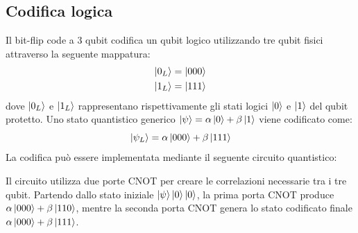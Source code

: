 \documentclass[a4paper,12pt]{report}
\theoremstyle{plain}
\begin{document}
\subsection{Codifica logica}
Il bit-flip code a 3 qubit codifica un qubit logico utilizzando tre qubit fisici attraverso la seguente mappatura:
\begin{align}
\ket{0_L} &= \ket{000} \\
\ket{1_L} &= \ket{111}
\end{align}
dove $\ket{0_L}$ e $\ket{1_L}$ rappresentano rispettivamente gli stati logici $\ket{0}$ e $\ket{1}$ del qubit protetto. Uno stato quantistico generico $\ket{\psi} = \alpha\ket{0} + \beta\ket{1}$ viene codificato come:
\[
\ket{\psi_L} = \alpha\ket{000} + \beta\ket{111}
\]
La codifica può essere implementata mediante il seguente circuito quantistico:
\begin{center}
\end{center}
Il circuito utilizza due porte CNOT per creare le correlazioni necessarie tra i tre qubit. Partendo dallo stato iniziale $\ket{\psi}\ket{0}\ket{0}$, la prima porta CNOT produce $\alpha\ket{000} + \beta\ket{110}$, mentre la seconda porta CNOT genera lo stato codificato finale $\alpha\ket{000} + \beta\ket{111}$.
\end{document}
